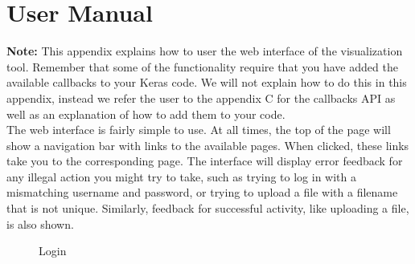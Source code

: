 \chapter{User Manual}


\textbf{Note:} This appendix explains how to user the web interface of the visualization tool. Remember that some of the functionality require that you have added the available callbacks to your Keras code. We will not explain how to do this in this appendix, instead we refer the user to the appendix C for the callbacks API as well as an explanation of how to add them to your code. \\

\noindent The web interface is fairly simple to use. At all times, the top of the page will show a navigation bar with links to the available pages. When clicked, these links take you to the corresponding page. The interface will display error feedback for any illegal action you might try to take, such as trying to log in with a mismatching username and password, or trying to upload a file with a filename that is not unique. Similarly, feedback for successful activity, like uploading a file, is also shown. \\


\begin{figure}[h!]
    \centering
        \caption{Login}
        \label{login}
\end{figure}


